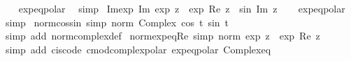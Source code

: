 \begin{isabellebody}
%
\isadelimproof
\ \ %
\endisadelimproof
%
\isatagproof
{}\isamarkupfalse%
\ exp{\isacharunderscore}{\kern0pt}eq{\isacharunderscore}{\kern0pt}polar\ \isamarkupfalse%
\ simp%
\endisatagproof
{\isafoldproof}%
%
\isadelimproof
\isanewline
%
\endisadelimproof
\isanewline
{}\isamarkupfalse%
\ Im{\isacharunderscore}{\kern0pt}exp{\isacharcolon}{\kern0pt}\ {\isachardoublequoteopen}Im\ {\isacharparenleft}{\kern0pt}exp\ z{\isacharparenright}{\kern0pt}\ {\isacharequal}{\kern0pt}\ exp\ {\isacharparenleft}{\kern0pt}Re\ z{\isacharparenright}{\kern0pt}\ {\isacharasterisk}{\kern0pt}\ sin\ {\isacharparenleft}{\kern0pt}Im\ z{\isacharparenright}{\kern0pt}{\isachardoublequoteclose}\isanewline
%
\isadelimproof
\ \ %
\endisadelimproof
%
\isatagproof
{}\isamarkupfalse%
\ exp{\isacharunderscore}{\kern0pt}eq{\isacharunderscore}{\kern0pt}polar\ \isamarkupfalse%
\ simp%
\endisatagproof
{\isafoldproof}%
%
\isadelimproof
\isanewline
%
\endisadelimproof
\isanewline
{}\isamarkupfalse%
\ norm{\isacharunderscore}{\kern0pt}cos{\isacharunderscore}{\kern0pt}sin\ {\isacharbrackleft}{\kern0pt}simp{\isacharbrackright}{\kern0pt}{\isacharcolon}{\kern0pt}\ {\isachardoublequoteopen}norm\ {\isacharparenleft}{\kern0pt}Complex\ {\isacharparenleft}{\kern0pt}cos\ t{\isacharparenright}{\kern0pt}\ {\isacharparenleft}{\kern0pt}sin\ t{\isacharparenright}{\kern0pt}{\isacharparenright}{\kern0pt}\ {\isacharequal}{\kern0pt}\ {}{\isachardoublequoteclose}\isanewline
%
\isadelimproof
\ \ %
\endisadelimproof
%
\isatagproof
{}\isamarkupfalse%
\ {\isacharparenleft}{\kern0pt}simp\ add{\isacharcolon}{\kern0pt}\ norm{\isacharunderscore}{\kern0pt}complex{\isacharunderscore}{\kern0pt}def{\isacharparenright}{\kern0pt}%
\endisatagproof
{\isafoldproof}%
%
\isadelimproof
\isanewline
%
\endisadelimproof
\isanewline
{}\isamarkupfalse%
\ norm{\isacharunderscore}{\kern0pt}exp{\isacharunderscore}{\kern0pt}eq{\isacharunderscore}{\kern0pt}Re\ {\isacharbrackleft}{\kern0pt}simp{\isacharbrackright}{\kern0pt}{\isacharcolon}{\kern0pt}\ {\isachardoublequoteopen}norm\ {\isacharparenleft}{\kern0pt}exp\ z{\isacharparenright}{\kern0pt}\ {\isacharequal}{\kern0pt}\ exp\ {\isacharparenleft}{\kern0pt}Re\ z{\isacharparenright}{\kern0pt}{\isachardoublequoteclose}\isanewline
%
\isadelimproof
\ \ %
\endisadelimproof
%
\isatagproof
{}\isamarkupfalse%
\ {\isacharparenleft}{\kern0pt}simp\ add{\isacharcolon}{\kern0pt}\ cis{\isachardot}{\kern0pt}code\ cmod{\isacharunderscore}{\kern0pt}complex{\isacharunderscore}{\kern0pt}polar\ exp{\isacharunderscore}{\kern0pt}eq{\isacharunderscore}{\kern0pt}polar\ Complex{\isacharunderscore}{\kern0pt}eq{\isacharparenright}{\kern0pt}%

\end{isabellebody}
